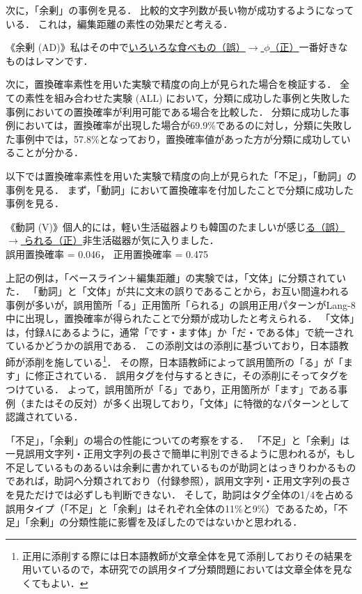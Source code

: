 \documentclass[japanese]{jnlp_1.4}
\renewenvironment{quote}{}{}
\newcommand{\ty}{}
\begin{document}
次に，「余剰」の事例を見る．
比較的文字列数が長い物が成功するようになっている．
これは，編集距離の素性の効果だと考える．

\begin{quote}
《余剰 (AD)》私はその中で\underline{いろいろな食べもの（誤）$\rightarrow$ $\phi$（正）}一番好きなものはレマンです．
\end{quote}

次に，置換確率素性を用いた実験で精度の向上が見られた場合を検証する．
全ての素性を組み合わせた実験 (ALL) において，分類に成功した事例と失敗した事例においての置換確率が利用可能である場合を比較した．
分類に成功した事例においては，置換確率が出現した場合が69.9\%であるのに対し，分類に失敗した事例中では，57.8\%となっており，置換確率値があった方が分類に成功していることが分かる．

以下では置換確率素性を用いた実験で精度の向上が見られた「不足」，「動詞」の事例を見る．
まず，「動詞」において置換確率を付加したことで分類に成功した事例を見る．

\begin{quote}
《動詞 (V)》個人的には，軽い生活磁器よりも韓国のたましいが感じ\underline{る（誤）$\rightarrow$ られる（正）}非生活磁器が気に入りました．\\
 誤用置換確率 = 0.046， 正用置換確率 = 0.475
\end{quote}

上記の例は，「ベースライン＋編集距離」の実験では，「文体」に分類されていた．
「動詞」と「文体」が共に文末の誤りであることから，お互い間違われる事例が多いが，誤用箇所「る」正用箇所「られる」の誤用正用パターンがLang-8中に出現し，置換確率が得られたことで分類が成功したと考えられる．
「文体」は，付録Aにあるように，通常「です・ます体」か「だ・である体」で統一されているかどうかの誤用である．
この添削文は\ty\hbox{}の添削に基づいており，日本語教師が添削を施している\footnote{正用に添削する際には日本語教師が文章全体を見て添削しておりその結果を用いているので，本研究での誤用タイプ分類問題においては文章全体を見なくてもよい．}．
その際，日本語教師によって誤用箇所の「る」が「ます」に修正されている．
誤用タグを付与するときに，その添削にそってタグをつけている．
よって，誤用箇所が「る」であり，正用箇所が「ます」である事例（またはその反対）が多く出現しており，「文体」に特徴的なパターンとして認識されている．

「不足」，「余剰」の場合の性能についての考察をする．
「不足」と「余剰」は一見誤用文字列・正用文字列の長さで簡単に判別できるように思われるが，もし不足しているものあるいは余剰に書かれているものが助詞とはっきりわかるものであれば，助詞へ分類されており（付録参照），誤用文字列・正用文字列の長さを見ただけでは必ずしも判断できない．
そして，助詞はタグ全体の1/4を占める誤用タイプ（「不足」と「余剰」はそれぞれ全体の11\%と9\%）であるため，「不足」「余剰」の分類性能に影響を及ぼしたのではないかと思われる．
\end{document}
